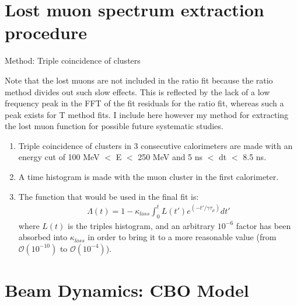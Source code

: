 \section{Lost muon spectrum extraction procedure}

Method: Triple coincidence of clusters

Note that the lost muons are not included in the ratio fit because the ratio method divides out such slow effects. This is reflected by the lack of a low frequency peak in the FFT of the fit residuals for the ratio fit, whereas such a peak exists for T method fits. I include here however my method for extracting the lost muon function for possible future systematic studies.

\begin{enumerate}
	\item{Triple coincidence of clusters in 3 consecutive calorimeters are made with an energy cut of 100 MeV $<$ E $<$ 250 MeV and 5 ns $<$ dt $<$ 8.5 ns.}
	\item{A time histogram is made with the muon cluster in the first calorimeter.}
	\item{The function that would be used in the final fit is:
		\begin{gather*}
			\Lambda(t) = 1 - \kappa_{loss} \int_{0}^{t} L(t')e^{(-t'/\gamma\tau_{\mu})} dt'
		\end{gather*}
	where $L(t)$ is the triples histogram, and an arbitrary $10^{-6}$ factor has been absorbed into $\kappa_{loss}$ in order to bring it to a more reasonable value (from $\mathcal{O}(10^{-10})$ to $\mathcal{O}(10^{-4})$).}
\end{enumerate}


\section{Beam Dynamics: CBO Model}


